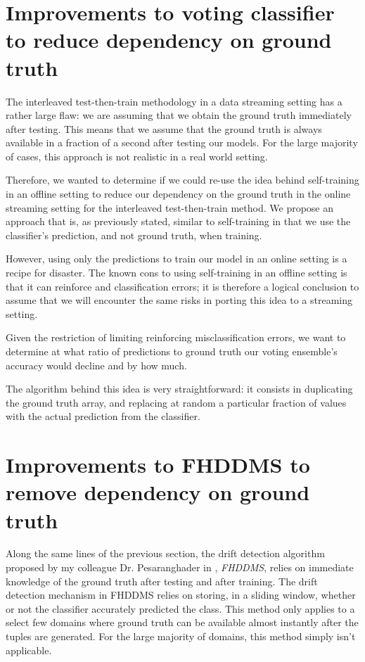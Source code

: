 
\section{Improvements to voting classifier to reduce dependency on ground truth}

The interleaved test-then-train methodology in a data streaming setting has a rather large flaw: we are assuming that we obtain the ground truth immediately after testing. This means that we assume that the ground truth is always available in a fraction of a second after testing our models. For the large majority of cases, this approach is not realistic in a real world setting.

Therefore, we wanted to determine if we could re-use the idea behind self-training in an offline setting to reduce our dependency on the ground truth in the online streaming setting for the interleaved test-then-train method. We propose an approach that is, as previously stated, similar to self-training in that we use the classifier's prediction, and not ground truth, when training.

However, using only the predictions to train our model in an online setting is a recipe for disaster. The known cons to using self-training in an offline setting is that it can reinforce and classification errors; it is therefore a logical conclusion to assume that we will encounter the same risks in porting this idea to a streaming setting.

Given the restriction of limiting reinforcing misclassification errors, we want to determine at what ratio of predictions to ground truth our voting ensemble's accuracy would decline and by how much.

The algorithm behind this idea is very straightforward: it consists in duplicating the ground truth array, and replacing at random a particular fraction of values with the actual prediction from the classifier.


\section{Improvements to FHDDMS to remove dependency on ground truth}

Along the same lines of the previous section, the drift detection algorithm proposed by my colleague Dr. Pesaranghader in \cite{pesaranghader2016fast}, \textit{FHDDMS}, relies on immediate knowledge of the ground truth after testing and after training. The drift detection mechanism in FHDDMS relies on storing, in a sliding window, whether or not the classifier accurately predicted the class. This method only applies to a select few domains where ground truth can be available almost instantly after the tuples are generated. For the large majority of domains, this method simply isn't applicable.

